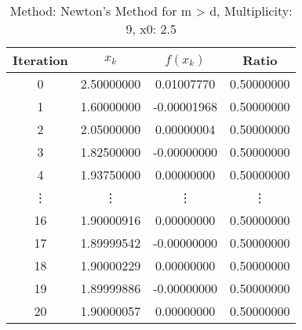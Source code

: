 \begin{table}
\centering
\caption{Method: Newton's Method for m > d, Multiplicity: 9, x0: 2.5}
\label{tab:table_Newton's_Method_for_m_>_d_9_2_5}
\begin{tabular}{c c c c}
\toprule
Iteration &      $x_k$ &    $f(x_k)$ &      Ratio \\
\midrule
        0 & 2.50000000 &  0.01007770 & 0.50000000 \\
        1 & 1.60000000 & -0.00001968 & 0.50000000 \\
        2 & 2.05000000 &  0.00000004 & 0.50000000 \\
        3 & 1.82500000 & -0.00000000 & 0.50000000 \\
        4 & 1.93750000 &  0.00000000 & 0.50000000 \\
   \vdots &     \vdots &      \vdots &     \vdots \\
       16 & 1.90000916 &  0.00000000 & 0.50000000 \\
       17 & 1.89999542 & -0.00000000 & 0.50000000 \\
       18 & 1.90000229 &  0.00000000 & 0.50000000 \\
       19 & 1.89999886 & -0.00000000 & 0.50000000 \\
       20 & 1.90000057 &  0.00000000 & 0.50000000 \\
\bottomrule
\end{tabular}
\end{table}
